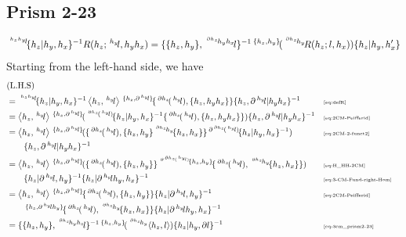 \documentclass[11pt, reqno]{amsart} %
\newcommand{\act}[1]{\,\sp{#1}\!}
\theoremstyle{definition}
\theoremstyle{remark}
\numberwithin{equation}{section}
\begin{document}
\subsection{Prism 2-23}
\[
  \act{\act{h_zh_y}l}\{h_z|h_y,h_x\}^{-1}R(h_z;\act{h_y}l,h_yh_x) = \{\{h_z,h_y\},\act{\act{\partial h_z}h_yh_x}l\}^{-1}\act{\{h_z,h_y\}}(\act{\act{\partial h_z}h_y}R(h_z;l,h_x))\{h_z|h_y,h_x'\}
\]
Starting from the left-hand side, we have
\begin{align*}
  &(\text{L.H.S}) \\
  &= \act{\act{h_zh_y}l}\{h_z|h_y,h_x\}^{-1}\left<h_z,\act{h_y}l\right>\act{\{h_z,\partial\act{h_y}l\}}\{\act{\partial h_z}(\act{h_y}l),\{h_z,h_yh_x\}\}\{h_z,\partial \act{h_y}l|h_yh_x\}^{-1} & &\text{\tiny \eqref{eq:defR}} \\
  &= \left<h_z,\act{h_y}l\right>\act{\{h_z,\partial\act{h_y}l\}}(\act{\act{\partial h_z}(\act{h_y}l)}\{h_z|h_y,h_x\}^{-1}\{\act{\partial h_z}(\act{h_y}l),\{h_z,h_yh_x\}\})\{h_z,\partial \act{h_y}l|h_yh_x\}^{-1} & & \text{\tiny \eqref{eq:2CM-Peifferid}} \\
  &= \left<h_z,\act{h_y}l\right>\act{\{h_z,\partial\act{h_y}l\}}(\{\act{\partial h_z}(\act{h_y}l),\{h_z,h_y\}\act{\act{\partial h_z}h_y}\{h_z,h_x\}\}\act{\partial\act{\partial h_z}(\act{h_y}l)}\{h_z|h_y,h_x\}^{-1}) & &\text{\tiny \eqref{eq:2CM-2-funct2}} \\
  &\qquad \{h_z,\partial \act{h_y}l|h_yh_x\}^{-1} \\
  &= \left<h_z,\act{h_y}l\right>\act{\{h_z,\partial\act{h_y}l\}}(\{\act{\partial h_z}(\act{h_y}l),\{h_z,h_y\}\}\act{\act{\partial \act{\partial h_z}(\act{h_y}l)}\{h_z,h_y\}}\{\act{\partial h_z}(\act{h_y}l),\act{\act{\partial h_z}h_y}\{h_z,h_x\}\}) & &\text{\tiny \eqref{eq:H_HH-2CM}} \\
  &\qquad 
  \{h_z|\partial \act{h_y}l,h_y\}^{-1}\{h_z|\partial \act{h_y}lh_y,h_x\}^{-1} & &\text{\tiny \eqref{eq:3-CM-Fund-right-Hom}} \\
  &= \left<h_z,\act{h_y}l\right>\act{\{h_z,\partial\act{h_y}l\}}\{\act{\partial h_z}(\act{h_y}l),\{h_z,h_y\}\}\{h_z|\partial \act{h_y}l,h_y\}^{-1} & & \text{\tiny \eqref{eq:2CM-Peifferid}} \\
  &\qquad \act{\{h_z,\partial\act{h_y}lh_y\}}\{\act{\partial h_z}(\act{h_y}l),\act{\act{\partial h_z}h_y}\{h_z,h_x\}\}\{h_z|\partial \act{h_y}lh_y,h_x\}^{-1} \\
  &= \{\{h_z,h_y\},\act{\act{\partial h_z}h_yh_z}l\}^{-1}\act{\{h_z,h_y\}}(\act{\act{\partial h_z}h_y}\left<h_z,l\right>)\{h_z|h_y,\partial l\}^{-1} & & \text{\tiny \eqref{eq:3cm_prism2-23}} \\

\end{align*}
\end{document}
